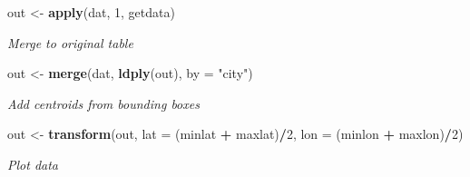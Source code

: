 \documentclass[author-year, review, 11pt]{components/elsarticle} %
\newenvironment{Shaded}{\begin{snugshade}}{\end{snugshade}}
\newcommand{\KeywordTok}[1]{\textcolor[rgb]{0.13,0.29,0.53}{\textbf{#1}}}
\newcommand{\DataTypeTok}[1]{\textcolor[rgb]{0.13,0.29,0.53}{#1}}
\newcommand{\DecValTok}[1]{\textcolor[rgb]{0.00,0.00,0.81}{#1}}
\newcommand{\StringTok}[1]{\textcolor[rgb]{0.31,0.60,0.02}{#1}}
\newcommand{\OperatorTok}[1]{\textcolor[rgb]{0.81,0.36,0.00}{\textbf{#1}}}
\newcommand{\NormalTok}[1]{#1}
\begin{document}
\begin{Shaded}
\begin{Highlighting}[]
\NormalTok{out <-}\StringTok{ }\KeywordTok{apply}\NormalTok{(dat, }\DecValTok{1}\NormalTok{, getdata)}
\end{Highlighting}
\end{Shaded}

\emph{Merge to original table}

\begin{Shaded}
\begin{Highlighting}[]
\NormalTok{out <-}\StringTok{ }\KeywordTok{merge}\NormalTok{(dat, }\KeywordTok{ldply}\NormalTok{(out), }\DataTypeTok{by =} \StringTok{"city"}\NormalTok{)}
\end{Highlighting}
\end{Shaded}

\emph{Add centroids from bounding boxes}

\begin{Shaded}
\begin{Highlighting}[]
\NormalTok{out <-}\StringTok{ }\KeywordTok{transform}\NormalTok{(out, }\DataTypeTok{lat =}\NormalTok{ (minlat }\OperatorTok{+}\StringTok{ }\NormalTok{maxlat)}\OperatorTok{/}\DecValTok{2}\NormalTok{, }\DataTypeTok{lon =}\NormalTok{ (minlon }\OperatorTok{+}\StringTok{ }\NormalTok{maxlon)}\OperatorTok{/}\DecValTok{2}\NormalTok{)}
\end{Highlighting}
\end{Shaded}

\emph{Plot data}
\end{document}
